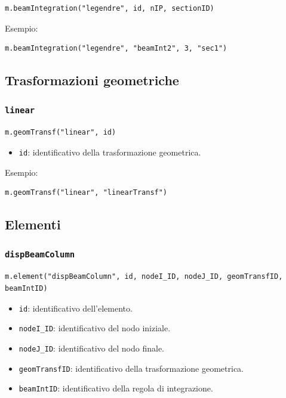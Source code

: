 \documentclass[11pt,a4paper]{article}
\begin{document}
\begin{lstlisting}[style=pythonstyle]
m.beamIntegration("legendre", id, nIP, sectionID)
\end{lstlisting}

Esempio:

\begin{lstlisting}[style=pythonstyle]
m.beamIntegration("legendre", "beamInt2", 3, "sec1")
\end{lstlisting}

\subsection{Trasformazioni geometriche}

\subsubsection{\texttt{linear}}

\begin{lstlisting}[style=pythonstyle]
m.geomTransf("linear", id)
\end{lstlisting}

\begin{itemize}
    \item \texttt{id}: identificativo della trasformazione geometrica.
\end{itemize}

Esempio:

\begin{lstlisting}[style=pythonstyle]
m.geomTransf("linear", "linearTransf")
\end{lstlisting}

\subsection{Elementi}

\subsubsection{\texttt{dispBeamColumn}}

\begin{lstlisting}[style=pythonstyle]
m.element("dispBeamColumn", id, nodeI_ID, nodeJ_ID, geomTransfID, beamIntID)
\end{lstlisting}

\begin{itemize}
    \item \texttt{id}: identificativo dell'elemento.
    \item \texttt{nodeI\_ID}: identificativo del nodo iniziale.
    \item \texttt{nodeJ\_ID}: identificativo del nodo finale.
    \item \texttt{geomTransfID}: identificativo della trasformazione geometrica.
    \item \texttt{beamIntID}: identificativo della regola di integrazione.
\end{itemize}
\end{document}
